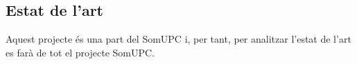 \subsection{Estat de l'art}

Aquest projecte és una part del SomUPC i, per tant, per analitzar l'estat de l'art es farà de tot el projecte SomUPC.




